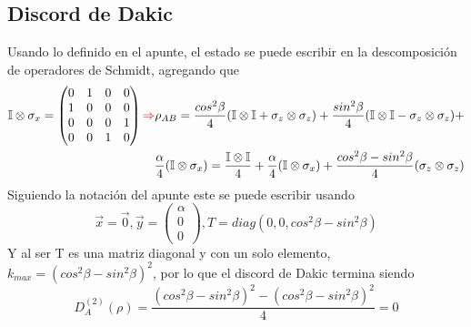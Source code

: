 \documentclass{book}
\begin{document}
\subsection{Discord de Dakic}
Usando lo definido en el apunte, el estado se puede escribir en la descomposición de operadores de Schmidt, agregando que 
\begin{equation}\label{eq2.158}\begin{aligned}\mathbb{I}\otimes \sigma_x=\begin{pmatrix} 0&1&0&0 \\ 1&0&0&0 \\ 0&0&0&1 \\ 0&0&1&0\end{pmatrix}\textcolor{red}{\Rightarrow} \rho_{AB}=\frac{cos^2 \beta}{4}(\mathbb{I}\otimes\mathbb{I}+\sigma_z\otimes\sigma_z)+\frac{sin^2 \beta}{4}(\mathbb{I}\otimes\mathbb{I}-\sigma_z\otimes\sigma_z)+\\ \frac{\alpha}{4}(\mathbb{I}\otimes\sigma_x)=\frac{\mathbb{I}\otimes\mathbb{I}}{4}+\frac{\alpha}{4}(\mathbb{I}\otimes\sigma_x)+\frac{cos^2\beta-sin^2\beta}{4}(\sigma_z\otimes\sigma_z)\end{aligned}\end{equation}
Siguiendo la notación del apunte este se puede escribir usando 
\begin{equation}\label{eq2.159}\vec{x}=\vec{0}, \vec{y}=\begin{pmatrix} \alpha \\ 0\\ 0\end{pmatrix}, T=diag(0,0,cos^2\beta-sin^2\beta) \end{equation}
Y al ser T es una matriz diagonal y con un solo elemento, $k_{max}=(cos^2\beta-sin^2\beta)^2$, por lo que el discord de Dakic termina siendo
\begin{equation}\label{eq2.160}D_A^{(2)}(\rho)=\frac{(cos^2\beta-sin^2\beta)^2-(cos^2\beta-sin^2\beta)^2}{4}=0\end{equation}
\end{document}
